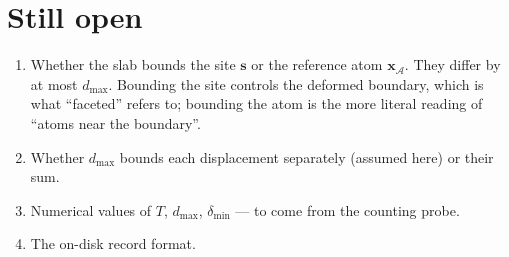 \documentclass[11pt]{article}
\newcommand{\A}{\mathcal{A}}
\newcommand{\dmax}{d_{\max}}
\newcommand{\dmin}{\delta_{\min}}
\begin{document}
\section*{Still open}

\begin{enumerate}
  \item Whether the slab bounds the site $\mathbf{s}$ or the reference atom
        $\mathbf{x}_\A$. They differ by at most $\dmax$. Bounding the site
        controls the deformed boundary, which is what ``faceted'' refers to;
        bounding the atom is the more literal reading of ``atoms near the
        boundary''.
  \item Whether $\dmax$ bounds each displacement separately (assumed here) or
        their sum.
  \item Numerical values of $T$, $\dmax$, $\dmin$ --- to come from the counting
        probe.
  \item The on-disk record format.
\end{enumerate}
\end{document}
